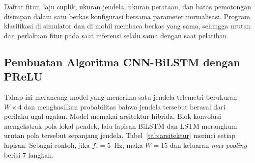 Daftar fitur, laju cuplik, ukuran jendela, ukuran perataan, dan batas pemotongan disimpan dalam satu berkas konfigurasi bersama parameter normalisasi. Program klasifikasi di simulator dan di mobil membaca berkas yang sama, sehingga urutan dan perlakuan fitur pada saat inferensi selalu sama dengan saat pelatihan.

\subsection{Pembuatan Algoritma CNN-BiLSTM dengan PReLU}
Tahap ini merancang model yang menerima satu jendela telemetri berukuran $W \times 4$ dan menghasilkan probabilitas bahwa jendela tersebut berasal dari perilaku ugal-ugalan. Model memakai arsitektur hibrida. Blok konvolusi mengekstrak pola lokal pendek, lalu lapisan BiLSTM dan LSTM merangkum urutan pola tersebut sepanjang jendela. Tabel~\ref{tab:arsitektur} merinci setiap lapisan. Sebagai contoh, jika $f_{s} = 5$~Hz, maka $W = 15$ dan keluaran \textit{max pooling} berisi 7 langkah.

